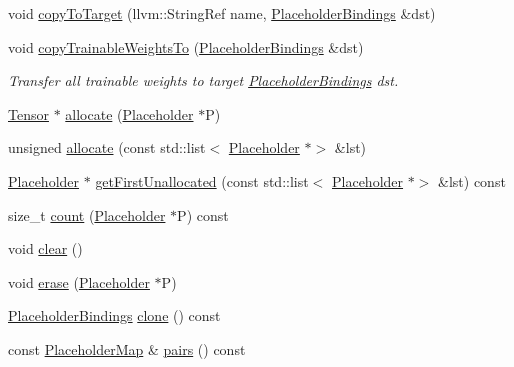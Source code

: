 \begin{Indent}
\begin{DoxyCompactItemize}
void \hyperlink{classglow_1_1_placeholder_bindings_a2c65bd5f6c7bb198e1432d6fc058b2e9}{copy\+To\+Target} (llvm\+::\+String\+Ref name, \hyperlink{classglow_1_1_placeholder_bindings}{Placeholder\+Bindings} \&dst)
\item 
\mbox{\label{classglow_1_1_placeholder_bindings_a55ac325bc3ca5743b42a0130b4a23bd3}} 
void \hyperlink{classglow_1_1_placeholder_bindings_a55ac325bc3ca5743b42a0130b4a23bd3}{copy\+Trainable\+Weights\+To} (\hyperlink{classglow_1_1_placeholder_bindings}{Placeholder\+Bindings} \&dst)
\begin{DoxyCompactList}\small\item\em Transfer all trainable weights to target \hyperlink{classglow_1_1_placeholder_bindings}{Placeholder\+Bindings} {\ttfamily dst}. \end{DoxyCompactList}\item 
\hyperlink{classglow_1_1_tensor}{Tensor} $\ast$ \hyperlink{classglow_1_1_placeholder_bindings_a25e8442dbf233cf922f866e4802c8d70}{allocate} (\hyperlink{classglow_1_1_placeholder}{Placeholder} $\ast$P)
\item 
unsigned \hyperlink{classglow_1_1_placeholder_bindings_a9786fe1975e69d07a06c326ba8d7b730}{allocate} (const std\+::list$<$ \hyperlink{classglow_1_1_placeholder}{Placeholder} $\ast$$>$ \&lst)
\item 
\hyperlink{classglow_1_1_placeholder}{Placeholder} $\ast$ \hyperlink{classglow_1_1_placeholder_bindings_a00ccce9fce94434ef6c3462a34fcef2d}{get\+First\+Unallocated} (const std\+::list$<$ \hyperlink{classglow_1_1_placeholder}{Placeholder} $\ast$$>$ \&lst) const
\item 
size\+\_\+t \hyperlink{classglow_1_1_placeholder_bindings_a8c344e5f81fbce432159f4e5c791bc85}{count} (\hyperlink{classglow_1_1_placeholder}{Placeholder} $\ast$P) const
\item 
void \hyperlink{classglow_1_1_placeholder_bindings_a0cc0e5f3957e8372a34bf3de811e96bd}{clear} ()
\item 
void \hyperlink{classglow_1_1_placeholder_bindings_a48eb62785028290edafa91239f671ddb}{erase} (\hyperlink{classglow_1_1_placeholder}{Placeholder} $\ast$P)
\item 
\hyperlink{classglow_1_1_placeholder_bindings}{Placeholder\+Bindings} \hyperlink{classglow_1_1_placeholder_bindings_a9129910138390bf1a3254478500683ab}{clone} () const
\item 
const \hyperlink{classglow_1_1_placeholder_bindings_ae0ff382e6d2719f72120f35909dd1862}{Placeholder\+Map} \& \hyperlink{classglow_1_1_placeholder_bindings_a1652efb98579b145068c17ddcbb5bfb4}{pairs} () const

\end{DoxyCompactItemize}
\end{Indent}
